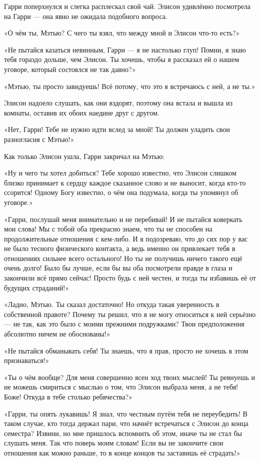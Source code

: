 \documentclass[a5paper, 9pt,
final, openany, twoside=true]{memoir}
\begin{document}
Гарри поперхнулся и слегка расплескал свой чай. Элисон удивлённо посмотрела на Гарри — она явно не ожидала подобного вопроса.

«О чём ты, Мэтью? С чего ты взял, что между мной и Элисон что-то есть?»

«Не пытайся казаться невинным, Гарри — я не настолько глуп! Помни, я знаю тебя гораздо дольше, чем Элисон. Ты хочешь, чтобы я рассказал ей о нашем уговоре, который состоялся не так давно?»

«Мэтью, ты просто завидуешь! Всё потому, что это я встречаюсь с ней, а не ты.»

Элисон надоело слушать, как они вздорят, поэтому она встала и вышла из комнаты, оставив их обоих наедине друг с другом.

«Нет, Гарри! Тебе не нужно идти вслед за мной! Ты должен уладить свои разногласия с Мэтью!»

Как только Элисон ушла, Гарри закричал на Мэтью:

«Ну и чего ты хотел добиться? Тебе хорошо известно, что Элисон слишком близко принимает к сердцу каждое сказанное слово и не выносит, когда кто-то ссорится! Одному Богу известно, о чём она подумала, когда ты упомянул об уговоре.»

«Гарри, послушай меня внимательно и не перебивай! И не пытайся коверкать мои слова! Мы с тобой оба прекрасно знаем, что ты не способен на продолжительные отношения с кем-либо. И я подозреваю, что до сих пор у вас не было тесного физического контакта, а ведь именно он привлекает тебя в отношениях сильнее всего остального! Но ты не получишь ничего такого ещё очень долго! Было бы лучше, если бы вы оба посмотрели правде в глаза и закончили всё прямо сейчас! Просто будь с ней честен, и тогда ты избавишь её от будущих страданий!»

«Ладно, Мэтью. Ты сказал достаточно! Но откуда такая уверенность в собственной правоте? Почему ты решил, что я не могу относиться к ней серьёзно — не так, как это было с моими прежними подружками? Твои предположения абсолютно ничем не обоснованы!»

«Не пытайся обманывать себя! Ты знаешь, что я прав, просто не хочешь в этом признаваться!»

«Ты о чём вообще? Для меня совершенно ясен ход твоих мыслей! Ты ревнуешь и не можешь смириться с мыслью о том, что Элисон выбрала меня, а не тебя! Боже! Откуда в тебе столько ребячества?»

«Гарри, ты опять лукавишь! Я знал, что честным путём тебя не переубедить! В таком случае, кто тогда держал пари, что начнёт встречаться с Элисон до конца семестра? Извини, но мне пришлось вспомнить об этом, иначе ты не стал бы слушать меня. Так что поверь моим словам! Если вы не закончите свои отношения как можно раньше, то в конце концов ты заставишь её страдать!»
\end{document}
